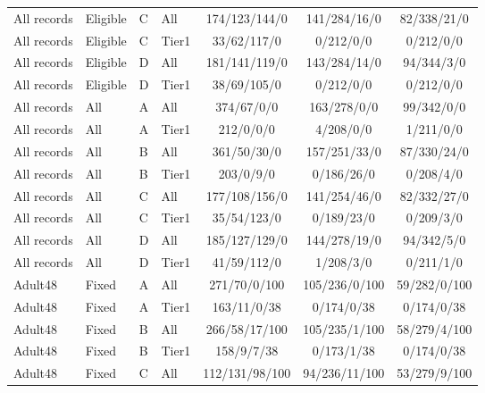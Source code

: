 \begin{longtable}{llllccc}
All records & Eligible & C & All & 174/123/144/0 & 141/284/16/0 & 82/338/21/0 \\

All records & Eligible & C & Tier1 & 33/62/117/0 & 0/212/0/0 & 0/212/0/0 \\

All records & Eligible & D & All & 181/141/119/0 & 143/284/14/0 & 94/344/3/0 \\

All records & Eligible & D & Tier1 & 38/69/105/0 & 0/212/0/0 & 0/212/0/0 \\

All records & All & A & All & 374/67/0/0 & 163/278/0/0 & 99/342/0/0 \\

All records & All & A & Tier1 & 212/0/0/0 & 4/208/0/0 & 1/211/0/0 \\

All records & All & B & All & 361/50/30/0 & 157/251/33/0 & 87/330/24/0 \\

All records & All & B & Tier1 & 203/0/9/0 & 0/186/26/0 & 0/208/4/0 \\

All records & All & C & All & 177/108/156/0 & 141/254/46/0 & 82/332/27/0 \\

All records & All & C & Tier1 & 35/54/123/0 & 0/189/23/0 & 0/209/3/0 \\

All records & All & D & All & 185/127/129/0 & 144/278/19/0 & 94/342/5/0 \\

All records & All & D & Tier1 & 41/59/112/0 & 1/208/3/0 & 0/211/1/0 \\

Adult48 & Fixed & A & All & 271/70/0/100 & 105/236/0/100 & 59/282/0/100 \\

Adult48 & Fixed & A & Tier1 & 163/11/0/38 & 0/174/0/38 & 0/174/0/38 \\

Adult48 & Fixed & B & All & 266/58/17/100 & 105/235/1/100 & 58/279/4/100 \\

Adult48 & Fixed & B & Tier1 & 158/9/7/38 & 0/173/1/38 & 0/174/0/38 \\

Adult48 & Fixed & C & All & 112/131/98/100 & 94/236/11/100 & 53/279/9/100 \\


\end{longtable}
